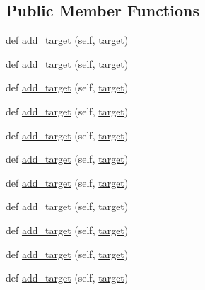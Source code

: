 \subsection*{Public Member Functions}
\begin{DoxyCompactItemize}
\item 
def \hyperlink{classwaflib_1_1_tools_1_1ccroot_1_1link__task_a8b0ad8c08501ac74933e9ea8fe24181b}{add\+\_\+target} (self, \hyperlink{lib_2expat_8h_a15a257516a87decb971420e718853137}{target})
\item 
def \hyperlink{classwaflib_1_1_tools_1_1ccroot_1_1link__task_a8b0ad8c08501ac74933e9ea8fe24181b}{add\+\_\+target} (self, \hyperlink{lib_2expat_8h_a15a257516a87decb971420e718853137}{target})
\item 
def \hyperlink{classwaflib_1_1_tools_1_1ccroot_1_1link__task_a8b0ad8c08501ac74933e9ea8fe24181b}{add\+\_\+target} (self, \hyperlink{lib_2expat_8h_a15a257516a87decb971420e718853137}{target})
\item 
def \hyperlink{classwaflib_1_1_tools_1_1ccroot_1_1link__task_a8b0ad8c08501ac74933e9ea8fe24181b}{add\+\_\+target} (self, \hyperlink{lib_2expat_8h_a15a257516a87decb971420e718853137}{target})
\item 
def \hyperlink{classwaflib_1_1_tools_1_1ccroot_1_1link__task_a8b0ad8c08501ac74933e9ea8fe24181b}{add\+\_\+target} (self, \hyperlink{lib_2expat_8h_a15a257516a87decb971420e718853137}{target})
\item 
def \hyperlink{classwaflib_1_1_tools_1_1ccroot_1_1link__task_a8b0ad8c08501ac74933e9ea8fe24181b}{add\+\_\+target} (self, \hyperlink{lib_2expat_8h_a15a257516a87decb971420e718853137}{target})
\item 
def \hyperlink{classwaflib_1_1_tools_1_1ccroot_1_1link__task_a8b0ad8c08501ac74933e9ea8fe24181b}{add\+\_\+target} (self, \hyperlink{lib_2expat_8h_a15a257516a87decb971420e718853137}{target})
\item 
def \hyperlink{classwaflib_1_1_tools_1_1ccroot_1_1link__task_a8b0ad8c08501ac74933e9ea8fe24181b}{add\+\_\+target} (self, \hyperlink{lib_2expat_8h_a15a257516a87decb971420e718853137}{target})
\item 
def \hyperlink{classwaflib_1_1_tools_1_1ccroot_1_1link__task_a8b0ad8c08501ac74933e9ea8fe24181b}{add\+\_\+target} (self, \hyperlink{lib_2expat_8h_a15a257516a87decb971420e718853137}{target})
\item 
def \hyperlink{classwaflib_1_1_tools_1_1ccroot_1_1link__task_a8b0ad8c08501ac74933e9ea8fe24181b}{add\+\_\+target} (self, \hyperlink{lib_2expat_8h_a15a257516a87decb971420e718853137}{target})
\item 
def \hyperlink{classwaflib_1_1_tools_1_1ccroot_1_1link__task_a8b0ad8c08501ac74933e9ea8fe24181b}{add\+\_\+target} (self, \hyperlink{lib_2expat_8h_a15a257516a87decb971420e718853137}{target})
\end{DoxyCompactItemize}
